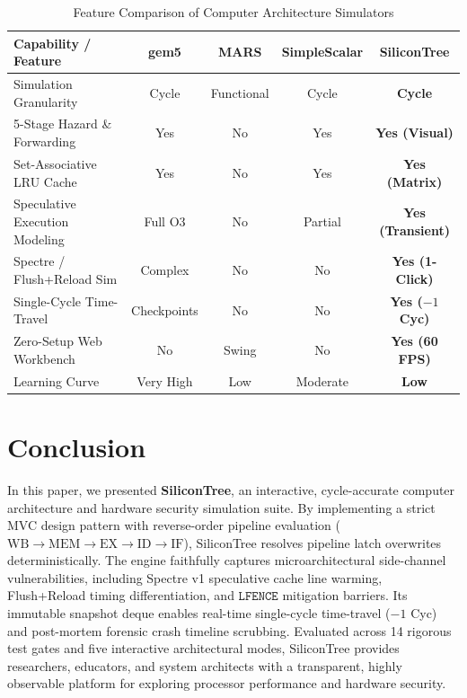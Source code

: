 \documentclass[journal,twocolumn,10pt]{IEEEtran}
\begin{document}
\begin{table}[t]
\caption{Feature Comparison of Computer Architecture Simulators}
\label{tab:comparison}
\centering
\begin{tabular}{lcccc}
\toprule
\textbf{Capability / Feature} & \textbf{gem5 \cite{binkert2011}} & \textbf{MARS \cite{vollmar2006}} & \textbf{SimpleScalar \cite{simplescalar}} & \textbf{SiliconTree} \\
\midrule
Simulation Granularity & Cycle & Functional & Cycle & \textbf{Cycle} \\
5-Stage Hazard \& Forwarding & Yes & No & Yes & \textbf{Yes (Visual)} \\
Set-Associative LRU Cache & Yes & No & Yes & \textbf{Yes (Matrix)} \\
Speculative Execution Modeling & Full O3 & No & Partial & \textbf{Yes (Transient)} \\
Spectre / Flush+Reload Sim & Complex & No & No & \textbf{Yes (1-Click)} \\
Single-Cycle Time-Travel & Checkpoints & No & No & \textbf{Yes ($-1$ Cyc)} \\
Zero-Setup Web Workbench & No & Swing & No & \textbf{Yes (60 FPS)} \\
Learning Curve & Very High & Low & Moderate & \textbf{Low} \\
\bottomrule
\end{tabular}
\end{table}

\section{Conclusion}
In this paper, we presented \textbf{SiliconTree}, an interactive, cycle-accurate computer architecture and hardware security simulation suite. By implementing a strict MVC design pattern with reverse-order pipeline evaluation ($\text{WB} \to \text{MEM} \to \text{EX} \to \text{ID} \to \text{IF}$), SiliconTree resolves pipeline latch overwrites deterministically. The engine faithfully captures microarchitectural side-channel vulnerabilities, including Spectre v1 speculative cache line warming, Flush+Reload timing differentiation, and $\texttt{LFENCE}$ mitigation barriers. Its immutable snapshot deque enables real-time single-cycle time-travel ($-1$ Cyc) and post-mortem forensic crash timeline scrubbing. Evaluated across 14 rigorous test gates and five interactive architectural modes, SiliconTree provides researchers, educators, and system architects with a transparent, highly observable platform for exploring processor performance and hardware security.
\end{document}
